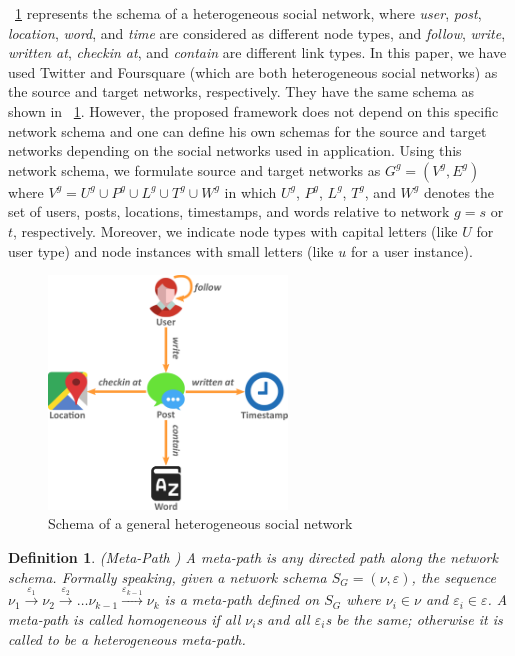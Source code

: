 \documentclass[conference]{IEEEtran}
\newtheorem{definition}{Definition}[section]
\begin{document}
\figurename~\ref{fig:schema} represents the schema of a heterogeneous social network, where \textit{user}, \textit{post}, \textit{location}, \textit{word}, and \textit{time} are considered as different node types, and \textit{follow}, \textit{write}, \textit{written at}, \textit{checkin at}, and \textit{contain} are different link types. 
In this paper, we have used Twitter and Foursquare (which are both heterogeneous social networks) as the source and target networks, respectively. They have the same schema as shown in \figurename~\ref{fig:schema}. However, the proposed framework does not depend on this specific network schema and one can define his own schemas for the source and target networks depending on the social networks used in application. Using this network schema, we formulate source and target networks as $G^g=(V^g,E^g)$ where $V^g=U^g\cup P^g\cup L^g\cup T^g\cup W^g$ in which $U^g$, $P^g$, $L^g$, $T^g$, and $W^g$ denotes the set of users, posts, locations, timestamps, and words relative to network $g=s$ or $t$, respectively. Moreover, we indicate node types with capital letters (like $U$ for user type) and node instances with small letters (like $u$ for a user instance).

\begin{figure}[!t]
\centering
\includegraphics[width=2.5in]{schema.pdf}
\caption{Schema of a general heterogeneous social network}
\label{fig:schema}
\end{figure} 

\begin{definition}{(Meta-Path \cite{sun2012mining})}
A meta-path is any directed path along the network schema. Formally speaking, given a network schema $S_G=(\nu, \varepsilon)$, the sequence $\nu_1\xrightarrow{\varepsilon_1}\nu_2\xrightarrow{\varepsilon_2}\dots\nu_{k-1}\xrightarrow{\varepsilon_{k-1}}\nu_k$ is a meta-path defined on $S_G$ where $\nu_i\in \nu$ and $\varepsilon_i\in \varepsilon$. A meta-path is called homogeneous if all $\nu_i$s and all $\varepsilon_i$s be the same; otherwise it is called to be a heterogeneous meta-path.
\end{definition}
\end{document}
